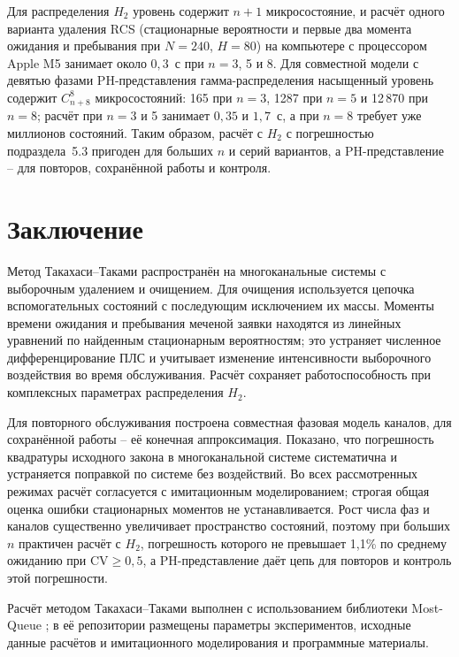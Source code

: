 \documentclass[a4paper,12pt]{article}
\begin{document}
Для распределения \(H_2\) уровень содержит \(n+1\) микросостояние, и расчёт одного варианта удаления RCS (стационарные вероятности и первые два момента ожидания и пребывания при \(N=240\), \(H=80\)) на компьютере с процессором Apple M5 занимает около \(0{,}3\)~с при \(n=3\), 5 и 8. Для совместной модели с девятью фазами PH-представления гамма-распределения насыщенный уровень содержит \(C_{n+8}^{8}\) микросостояний: 165 при \(n=3\), 1287 при \(n=5\) и 12\,870 при \(n=8\); расчёт при \(n=3\) и 5 занимает \(0{,}35\) и \(1{,}7\)~с, а при \(n=8\) требует уже миллионов состояний. Таким образом, расчёт с \(H_2\) с погрешностью подраздела~5.3 пригоден для больших \(n\) и серий вариантов, а PH-представление -- для повторов, сохранённой работы и контроля.

\section{Заключение}
Метод Такахаси--Таками распространён на многоканальные системы с выборочным удалением и очищением. Для очищения используется цепочка вспомогательных состояний с последующим исключением их массы. Моменты времени ожидания и пребывания меченой заявки находятся из линейных уравнений по найденным стационарным вероятностям; это устраняет численное дифференцирование ПЛС и учитывает изменение интенсивности выборочного воздействия во время обслуживания. Расчёт сохраняет работоспособность при комплексных параметрах распределения \(H_2\).

Для повторного обслуживания построена совместная фазовая модель каналов, для сохранённой работы -- её конечная аппроксимация. Показано, что погрешность квадратуры исходного закона в многоканальной системе систематична и устраняется поправкой по системе без воздействий. Во всех рассмотренных режимах расчёт согласуется с имитационным моделированием; строгая общая оценка ошибки стационарных моментов не устанавливается. Рост числа фаз и каналов существенно увеличивает пространство состояний, поэтому при больших \(n\) практичен расчёт с \(H_2\), погрешность которого не превышает 1,1\% по среднему ожиданию при \(\mathrm{CV}\ge0{,}5\), а PH-представление даёт цепь для повторов и контроль этой погрешности.

Расчёт методом Такахаси--Таками выполнен с использованием библиотеки Most-Queue \cite{mostqueue2026}; в её репозитории размещены параметры экспериментов, исходные данные расчётов и имитационного моделирования и программные материалы.

\printbibliography
\end{document}
